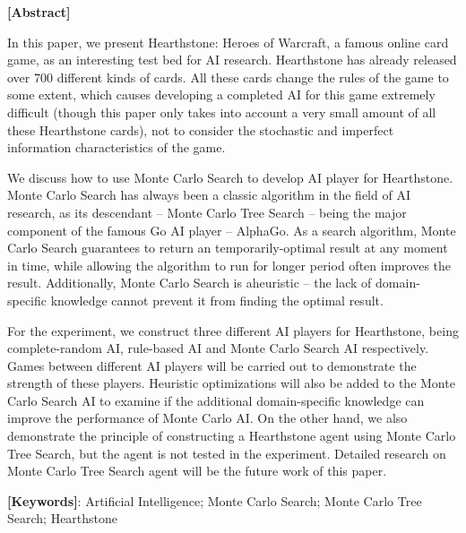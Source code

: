 \vspace{0.5cm}
{}
\centerline{\xiaoerhao \textbf{[Abstract]}}
\vspace{0.5cm}

In this paper, we present Hearthstone: Heroes of Warcraft, a famous online card game, as an interesting test bed for AI research. Hearthstone has already released over 700 different kinds of cards. All these cards change the rules of the game to some extent, which causes developing a completed AI for this game extremely difficult (though this paper only takes into account a very small amount of all these Hearthstone cards), not to consider the stochastic and imperfect information characteristics of the game.

We discuss how to use Monte Carlo Search to develop AI player for Hearthstone. Monte Carlo Search has always been a classic algorithm in the field of AI research, as its descendant -- Monte Carlo Tree Search -- being the major component of the famous Go AI player -- AlphaGo. As a search algorithm, Monte Carlo Search guarantees to return an temporarily-optimal result at any moment in time, while allowing the algorithm to run for longer period often improves the result. Additionally, Monte Carlo Search is aheuristic -- the lack of domain-specific knowledge cannot prevent it from finding the optimal result.

For the experiment, we construct three different AI players for Hearthstone, being complete-random AI, rule-based AI and Monte Carlo Search AI respectively. Games between different AI players will be carried out to demonstrate the strength of these players. Heuristic optimizations will also be added to the Monte Carlo Search AI to examine if the additional domain-specific knowledge can improve the performance of Monte Carlo AI.
On the other hand, we also demonstrate the principle of constructing a Hearthstone agent using Monte Carlo Tree Search, but the agent is not tested in the experiment.
Detailed research on Monte Carlo Tree Search agent will be the future work of this paper.

\vspace{0.5cm}
\par\setlength\parindent{0em}\textbf{[Keywords]}: Artificial Intelligence; Monte Carlo Search; Monte Carlo Tree Search; Hearthstone
\par\setlength\parindent{2em}
